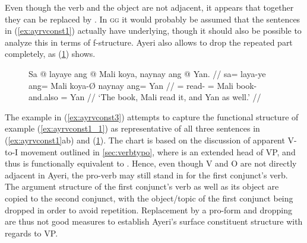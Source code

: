 Even though the verb and the object are not adjacent, it appears that together
they can be replaced by . In \textsc{gg}
it would probably be assumed that the sentences in (\ref{ex:ayrvconst1})
actually have 
underlying, though it should also be possible to analyze this in terms of
f-structure. Ayeri also allows to drop the repeated part completely, as
(\ref{ex:ayrvconst2}) shows.

\begin{figure}[h]
\ex\label{ex:ayrvconst2}\begingl
	\gla Sa @ layaye ang @ Mali koya, naynay ang @ Yan. //
	\glb sa= laya-ye ang= Mali koya-Ø naynay ang= Yan //
	\glc \PatT{}= read-\TsgF{} \Aarg{}= Mali book-\Top{} and.also \Aarg{}= 
		Yan //
	\glft `The book, Mali read it, and Yan as well.' //
\endgl
\xe
\end{figure}

The example in (\ref{ex:ayrvconst3}) attempts to capture the functional
structure of example (\ref{ex:ayrvconst1_1}) as representative of all three
sentences in (\ref{ex:ayrvconst1}ab) and (\ref{ex:ayrvconst2}). The chart is
based on the discussion of apparent V-to-I movement outlined in
\autoref{sec:verbtypo}, where  is an extended head of VP, and thus is
functionally equivalent to . Hence, even though V and O are not
directly adjacent in Ayeri, the pro-verb  may still stand
in for the first conjunct's verb. The argument structure of the first
conjunct's verb as well as its object are copied to the second conjunct, with
the object/topic of the first conjunct being dropped in order to avoid
repetition. Replacement by a pro-form and dropping are thus not good measures
to establish Ayeri's surface constituent structure with regards to VP.

